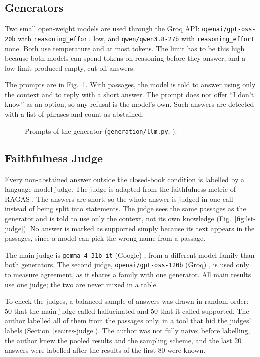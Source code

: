 \subsection{Generators}
Two small open-weight models are used through the Groq API: \texttt{openai/gpt-oss-20b}
\cite{openai2025gptoss} with \texttt{reasoning\_effort} low, and \texttt{qwen/qwen3.8-27b}
\cite{qwen2026qwen38} with \texttt{reasoning\_effort} none. Both use temperature
 and at most  tokens. The limit has to be this high because
both models can spend tokens on reasoning before they answer, and a low limit produced empty, cut-off
answers.

The prompts are in Fig.~\ref{fig:lst-prompt}. With passages, the model is told to answer using only
the context and to reply with a short answer. The prompt does not offer ``I don't know'' as an
option, so any refusal is the model's own. Such answers are detected with a list of phrases and count
as abstained.

\begin{figure}[htbp]

\caption{Prompts of the generator (\texttt{generation/llm.py}, ).}\label{fig:lst-prompt}
\end{figure}

\subsection{Faithfulness Judge}\label{sec:judge}
Every non-abstained answer outside the closed-book condition is labelled by a language-model judge.
The judge is adapted from the faithfulness metric of RAGAS \cite{es2024ragas}. The answers are short,
so the whole answer is judged in one call instead of being split into statements. The judge sees the
same passages as the generator and is told to use only the context, not its own knowledge
(Fig.~\ref{fig:lst-judge}). No answer is marked as supported simply because its text appears in the
passages, since a model can pick the wrong name from a passage.

The main judge is \texttt{gemma-4-31b-it} (Google) \cite{gemma2026gemma4}, from a different model family
than both generators. The second judge, \texttt{openai/gpt-oss-120b} (Groq) \cite{openai2025gptoss}, is used
only to measure agreement, as it shares a family with one generator. All main results use one judge; the two
are never mixed in a table.

To check the judges, a balanced sample of  answers was drawn in random order: 50 that the
main judge called hallucinated and 50 that it called supported. The author labelled all of them from
the passages only, in a tool that hid the judges' labels (Section~\ref{sec:res-judge}). The author was not fully
naive: before labelling, the author knew the pooled results and the sampling scheme, and the last 20 answers
were labelled after the results of the first 80 were known.

